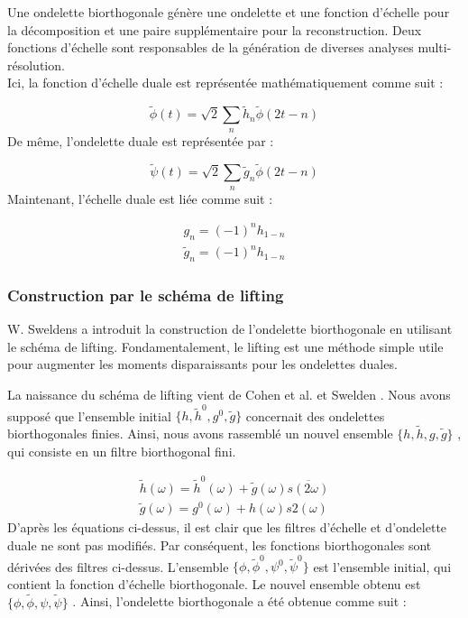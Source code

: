 Une ondelette biorthogonale génère une ondelette et une fonction d'échelle pour la décomposition et une paire supplémentaire pour la reconstruction. Deux fonctions d'échelle sont responsables de la génération de diverses analyses multi-résolution.\\
Ici, la fonction d'échelle duale est représentée mathématiquement comme suit :

\begin{equation}
    \tilde{\phi} (t) = \sqrt{2}\sum_{n}\tilde{h}_{n}\tilde{\phi} (2t - n) 
\end{equation}
De même, l'ondelette duale est représentée par :

\begin{equation}
    \tilde{\psi} (t) = \sqrt{2}\sum_{n}\tilde{g}_{n}\tilde{\phi} (2t - n) 
\end{equation}
Maintenant, l'échelle duale est liée comme suit :

\begin{equation}
    \begin{array}{l}{g_{n} = (-1)^{n}h_{1 - n}}\\ {\tilde{g}_{n} = (-1)^{n}h_{1 - n}} \end{array} 
\end{equation}

\subsubsection{Construction par le schéma de lifting }
W. Sweldens a introduit la construction de l'ondelette biorthogonale en utilisant le schéma de lifting. Fondamentalement, le lifting est une méthode simple utile pour augmenter les moments disparaissants pour les ondelettes duales.

La naissance du schéma de lifting vient de Cohen et al. et Swelden \cite{21}. Nous avons supposé que l'ensemble initial \(\{h,\tilde{h}^0,g^0,\tilde{g}\}\) concernait des ondelettes biorthogonales finies. Ainsi, nous avons rassemblé un nouvel ensemble \(\{h,\tilde{h},g,\tilde{g}\}\) , qui consiste en un filtre biorthogonal fini.

\begin{equation}
    \begin{array}{l}\tilde{h} (\omega) = \tilde{h}^0 (\omega) + \tilde{g} (\omega)\overline{s(2\omega)} \\ \tilde{g} (\omega) = g^0 (\omega) + h(\omega)s2(\omega) \end{array} 
\end{equation}
D'après les équations ci-dessus, il est clair que les filtres d'échelle et d'ondelette duale ne sont pas modifiés. Par conséquent, les fonctions biorthogonales sont dérivées des filtres ci-dessus. L'ensemble \(\{\phi ,\tilde{\phi}^0,\psi^0,\tilde{\psi}^0\}\) est l'ensemble initial, qui contient la fonction d'échelle biorthogonale. Le nouvel ensemble obtenu est \(\{\phi ,\tilde{\phi},\psi ,\tilde{\psi}\}\) . Ainsi, l'ondelette biorthogonale a été obtenue comme suit :

